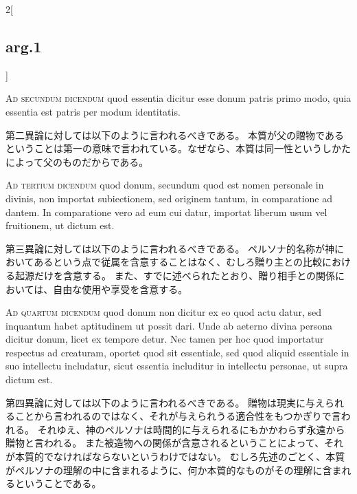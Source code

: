 \documentclass[paper=a4paper,fontsize=10pt,jafontsize=9pt,titlepage]{jlreq}
\begin{document}
\begin{paracol}{2}[\subsection{arg.1}]
\switchcolumn*[\subsection{ad.2}]

\textsc{Ad secundum dicendum} quod essentia dicitur esse donum patris primo modo, quia essentia est patris per modum identitatis.

\switchcolumn

第二異論に対しては以下のように言われるべきである。
本質が父の贈物であるということは第一の意味で言われている。なぜなら、本質は同一性というしかたによって父のものだからである。

\switchcolumn*[\subsection{ad.3}]

\textsc{Ad tertium dicendum} quod donum, secundum quod est nomen personale in divinis, non importat subiectionem, sed originem tantum, in comparatione ad dantem. In comparatione vero ad eum cui datur, importat liberum usum vel fruitionem, ut dictum est.

\switchcolumn

第三異論に対しては以下のように言われるべきである。
ペルソナ的名称が神においてあるという点で従属を含意することはなく、むしろ贈り主との比較における起源だけを含意する。
また、すでに述べられたとおり、贈り相手との関係においては、自由な使用や享受を含意する。

\switchcolumn*[\subsection{ad.4}]

\textsc{Ad quartum dicendum} quod donum non dicitur ex eo quod actu datur, sed inquantum habet aptitudinem ut possit dari. Unde ab aeterno divina persona dicitur donum, licet ex tempore detur. Nec tamen per hoc quod importatur respectus ad creaturam, oportet quod sit essentiale, sed quod aliquid essentiale in suo intellectu includatur, sicut essentia includitur in intellectu personae, ut supra dictum est.

\switchcolumn

第四異論に対しては以下のように言われるべきである。
贈物は現実に与えられることから言われるのではなく、それが与えられうる適合性をもつかぎりで言われる。
それゆえ、神のペルソナは時間的に与えられるにもかかわらず永遠から贈物と言われる。
また被造物への関係が含意されるということによって、それが本質的でなければならないというわけではない。
むしろ先述のごとく、本質がペルソナの理解の中に含まれるように、何か本質的なものがその理解に含まれるということである。

\end{paracol}
\end{document}
